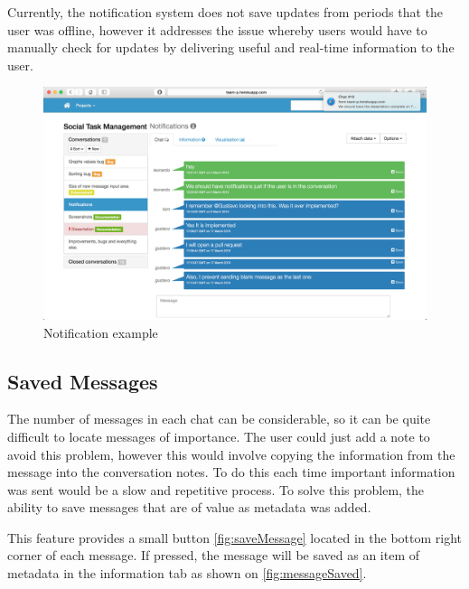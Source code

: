 \documentclass[a4paper]{l3proj}
\begin{document}
Currently, the notification system does not save updates from periods that the user was offline, however it addresses the issue whereby users would have to manually check for updates by delivering useful and real-time information to the user.


\begin{figure}[ht]
\centering
\includegraphics[scale=0.25]{notification}
\caption{Notification example}
\label{figure:notification}
\end{figure}


\subsection{Saved Messages}
\label{savedMessages}

The number of messages in each chat can be considerable, so it can be quite difficult to locate messages of importance. The user could just add a note to avoid this problem, however this would involve copying the information from the message into the conversation notes. To do this each time important information was sent would be a slow and repetitive process. To solve this problem, the ability to save messages that are of value as metadata was added.

This feature provides a small button \autoref{fig:saveMessage} located in the bottom right corner of each message. If pressed, the message will be saved as an item of metadata in the information tab as shown on \autoref{fig:messageSaved}.
\end{document}
